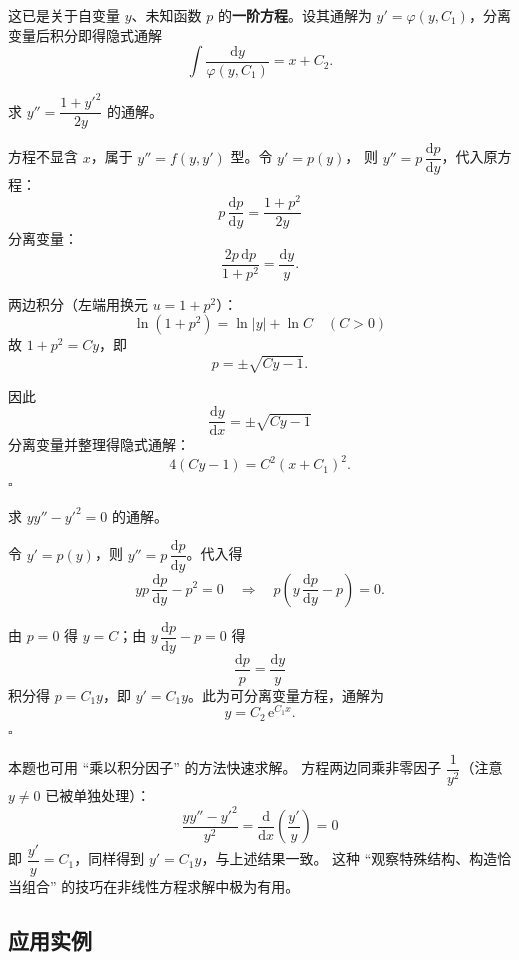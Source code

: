 \documentclass[lang=cn,11pt]{elegantbook}
\begin{document}
这已是关于自变量 $y$、未知函数 $p$ 的\textbf{一阶方程}。设其通解为 $y'=\varphi(y,C_1)$，分离变量后积分即得隐式通解
\[
\int\frac{\mathrm{d}y}{\varphi(y,C_1)}=x+C_2.
\]

\begin{exercise}
求 $y''=\dfrac{1+y'^{2}}{2y}$ 的通解。
\end{exercise}
\begin{solution}
方程不显含 $x$，属于 $y''=f(y,y')$ 型。令 $y'=p(y)$，
则 $y''=p\,\dfrac{\mathrm{d}p}{\mathrm{d}y}$，代入原方程：
\[
p\,\frac{\mathrm{d}p}{\mathrm{d}y}=\frac{1+p^{2}}{2y}
\]
分离变量：
\[
\frac{2p\,\mathrm{d}p}{1+p^{2}}=\frac{\mathrm{d}y}{y}.
\]

两边积分（左端用换元 $u=1+p^2$）：
\[
\ln(1+p^{2})=\ln|y|+\ln C \quad (C>0)
\]
故 $1+p^{2}=Cy$，即
\[
p=\pm\sqrt{Cy-1}.
\]

因此 
\[
\frac{\mathrm{d}y}{\mathrm{d}x}=\pm\sqrt{Cy-1}
\]
分离变量并整理得隐式通解：
\[
\boxed{4(Cy-1)=C^{2}(x+C_{1})^{2}.}
\]
\hfill$\square$
\end{solution}

\begin{exercise}
求 $yy''-y'^{2}=0$ 的通解。
\end{exercise}
\begin{solution}
令 $y'=p(y)$，则 $y''=p\,\dfrac{\mathrm{d}p}{\mathrm{d}y}$。代入得
\[
yp\,\frac{\mathrm{d}p}{\mathrm{d}y}-p^{2}=0
\quad\Longrightarrow\quad
p\!\left(y\,\frac{\mathrm{d}p}{\mathrm{d}y}-p\right)=0.
\]

由 $p=0$ 得 $y=C$；由 $y\,\dfrac{\mathrm{d}p}{\mathrm{d}y}-p=0$ 得 
\[
\frac{\mathrm{d}p}{p}=\frac{\mathrm{d}y}{y}
\]
积分得 $p=C_{1}y$，即 $y'=C_{1}y$。此为可分离变量方程，通解为
\[
\boxed{y=C_{2}\,\mathrm{e}^{C_{1}x}.}
\]
\hfill$\square$
\end{solution}

\begin{remark}[另解：凑全微分法]
本题也可用 ``乘以积分因子'' 的方法快速求解。
方程两边同乘非零因子 $\dfrac{1}{y^{2}}$（注意 $y \neq 0$ 已被单独处理）：
\[
\frac{yy''-y'^{2}}{y^{2}}
=\frac{\mathrm{d}}{\mathrm{d}x}\!\left(\frac{y'}{y}\right)=0
\]
即 $\dfrac{y'}{y}=C_{1}$，同样得到 $y'=C_{1}y$，与上述结果一致。
这种 ``观察特殊结构、构造恰当组合'' 的技巧在非线性方程求解中极为有用。
\end{remark}


\subsection{应用实例}
\end{document}
